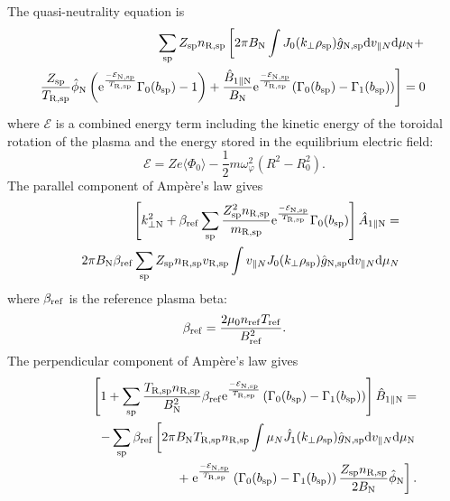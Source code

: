 The quasi-neutrality equation is
\begin{eqnarray}
	\hspace{-5mm}
	&& \sum_{\st{sp}} Z_{\st{sp}} n_{\st{R,sp}} \left[ 2 \pi B_{\st{N}} \int J_0(k_{\perp} \rho_{\st{sp}}) \hat{g}_{\st{N,sp}} \mathrm{d} v_{\parallel N} \mathrm{d} \mu_{\st{N}} + \right. \nonumber \\ 
	\hspace{-5mm}
	&& \left. \frac{Z_{\st{sp}}}{T_{\st{R,sp}}} \hat{\phi}_{\st{N}} \left( \st{e}^{\frac{-\mathcal{E}_{\st{N,sp}}}{T_{\st{R,sp}}}} \Gamma_0(b_{\st{sp}}) - 1 \right) + \frac{\hat{B}_{1 \parallel \st{N}}}{B_{\st{N}}} \st{e}^{\frac{-\mathcal{E}_{\st{N,sp}}}{T_{\st{R,sp}}}} (\Gamma_0(b_{\st{sp}}) - \Gamma_1(b_{\st{sp}})) \right] = 0
	\label{eq:poisson}
\end{eqnarray}
where $\mathcal{E}$ is a combined energy term including the kinetic energy of the toroidal rotation of the plasma and the energy stored in the equilibrium electric field:
\begin{equation}
 \mathcal{E} = Z e \langle \Phi_0 \rangle - \frac{1}{2} m \omega_{\varphi}^2 (R^2-R_0^2).
\end{equation}
The parallel component of Amp\`ere's law gives
\begin{eqnarray}
	&& \left[ k_{\perp \mathrm{N}}^2 + \beta_{\mathrm{ref}} \sum_{\mathrm{sp}} \frac{Z_{\mathrm{sp}}^2 n_{\mathrm{R,sp}}}{m_{\mathrm{R,sp}}} \mathrm{e}^{\frac{-\mathcal{E}_{\mathrm{N,sp}}}{T_{\mathrm{R,sp}}}} \Gamma_0(b_{\mathrm{sp}}) \right] \hat{A}_{1 \parallel \mathrm{N}} = \nonumber \\
	&& 2 \pi B_{\mathrm{N}} \beta_{\mathrm{ref}} \sum_{\mathrm{sp}} Z_{\mathrm{sp}} n_{\mathrm{R,sp}} v_{\mathrm{R,sp}} \int v_{\parallel N} J_0(k_{\perp} \rho_{\mathrm{sp}}) \hat{g}_{\mathrm{N,sp}} \mathrm{d} v_{\parallel N} \mathrm{d} \mu_{N}
	\label{eq:apar} \label{eq:AmpPar}
\end{eqnarray}
where $\beta_{\mathrm{ref}}$ is the reference plasma beta:
\begin{equation}
	\beta_{\mathrm{ref}} = \frac{2 \mu_0 n_{\mathrm{ref}} T_{\mathrm{ref}}}{B_{\mathrm{ref}}^2}.
	\label{eq:beta}
\end{equation}
The perpendicular component of Amp\`ere's law gives
\begin{eqnarray}
	&& \hspace{-1cm} \left[ 1 + \sum_{\st{sp}} \frac{T_{\st{R,sp}} n_{\st{R,sp}}}{B_{\st{N}}^2} \beta_{\st{ref}} \st{e}^{\frac{-\mathcal{E}_{\st{N,sp}}}{T_{\st{R,sp}}}} \left( \Gamma_0(b_{\st{sp}}) - \Gamma_1(b_{\st{sp}}) \right) \right] \hat{B}_{1 \parallel \st{N}} = \nonumber \\
	&& \hspace{1cm} - \sum_{\st{sp}} \beta_{\st{ref}} \left[ 2 \pi B_{\st{N}} T_{\st{R,sp}} n_{\st{R,sp}} \int \mu_{N} \hat{J}_1(k_{\perp} \rho_{\st{sp}}) \hat{g}_{\st{N,sp}} \mathrm{d}v_{\parallel N} \mathrm{d} \mu_{\st{N}} \right. \nonumber\\
	&& \hspace{1cm} + \left. \st{e}^{\frac{-\mathcal{E}_{\st{N,sp}}}{T_{\st{R,sp}}}} \left( \Gamma_0(b_{\st{sp}}) - \Gamma_1(b_{\st{sp}}) \right) \frac{Z_{\st{sp}} n_{\st{R,sp}}}{2 B_{\st{N}}} \hat{\phi}_{\st{N}} \right].
	\label{eq:bpar} \label{eq:AmpPerp}
\end{eqnarray}
